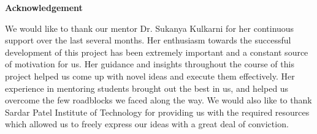 \newpage
\thispagestyle{empty} 
\begin{center}
 \large\textbf{Acknowledgement}
\end{center}
We would like to thank our mentor Dr. Sukanya Kulkarni for her continuous support over the last several months. Her enthusiasm towards the successful development of this project has been extremely important and a constant source of motivation for us. Her guidance and insights throughout the course of this project helped us come up with novel ideas and execute them effectively. Her experience in mentoring students brought out the best in us, and helped us overcome the few roadblocks we faced along the way. We would also like to thank Sardar Patel Institute of Technology for providing us with the required resources which allowed us to freely express our ideas with a great deal of conviction.
\newpage
